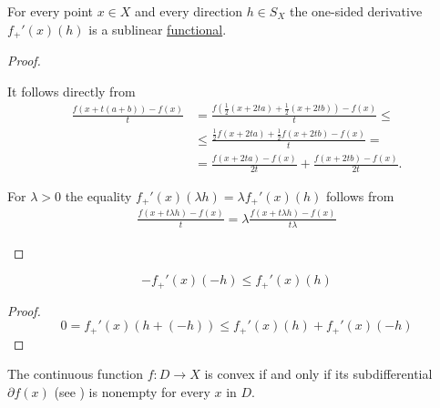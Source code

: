 \begin{proposition}\label{thm:convex_one_sided_derivatives_sublinear}
  For every point \( x \in X \) and every direction \( h \in S_X \) the one-sided derivative \( f_+'(x)(h) \) is a sublinear \hyperref[def:sublinear_functional]{functional}.
\end{proposition}
\begin{proof}\mbox{} 
  \begin{description}
     It follows directly from
    \begin{align*}
      \frac {f(x + t(a + b)) - f(x)} t
      &=
      \frac {f(\tfrac 1 2 (x + 2ta) + \tfrac 1 2 (x + 2tb)) - f(x)} t
      \leq \\ &\leq
      \frac {\tfrac 1 2 f(x + 2ta) + \tfrac 1 2 f(x + 2tb) - f(x)} t
      = \\ &=
      \frac {f(x + 2ta) - f(x)} {2t} + \frac {f(x + 2tb) - f(x)} {2t}.
    \end{align*}

     For \( \lambda > 0 \) the equality \( f_+'(x)(\lambda h) = \lambda f_+'(x)(h) \) follows from
    \begin{align*}
      \frac {f(x + t \lambda h) - f(x)} t
      =
      \lambda \frac {f(x + t \lambda h) - f(x)} {t \lambda}
    \end{align*}
  \end{description}
\end{proof}

\begin{corollary}\label{thm:convex_one_sided_derivative_negative_inequality}
  \begin{equation*}
    -f_+'(x)(-h) \leq f_+'(x)(h)
  \end{equation*}
\end{corollary}
\begin{proof}
  \begin{equation*}
      0 = f_+'(x)(h + (-h)) \leq f_+'(x)(h) + f_+'(x)(-h)
  \end{equation*}
\end{proof}

\begin{proposition}\label{thm:convex_iff_subdifferential_nonempty}
  The continuous function \( f: D \to X \) is convex if and only if its subdifferential \( \partial f(x) \) (see ) is nonempty for every \( x \) in \( D \).
\end{proposition}

